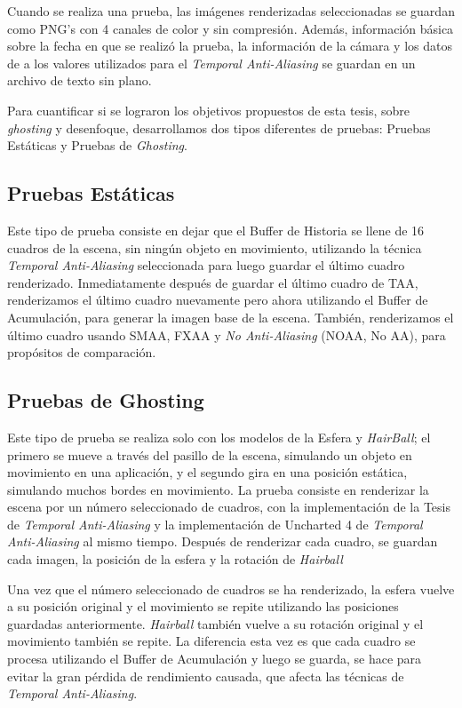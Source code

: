 \documentclass[pregrado]{tesis-usb} %
\begin{document}
Cuando se realiza una prueba, las imágenes renderizadas seleccionadas se guardan como PNG’s con 4 canales de color y sin compresión. Además, información básica sobre la fecha en que se realizó la prueba, la información de la cámara y los datos de a los valores utilizados para el \textit{Temporal Anti-Aliasing} se guardan en un archivo de texto sin plano.

Para cuantificar si se lograron los objetivos propuestos de esta tesis, sobre \textit{ghosting} y desenfoque, desarrollamos dos tipos diferentes de pruebas: Pruebas Estáticas y Pruebas de \textit{Ghosting}.

\subsection{Pruebas Estáticas}
Este tipo de prueba consiste en dejar que el Buffer de Historia se llene de 16 cuadros de la escena, sin ningún objeto en movimiento, utilizando la técnica \textit{Temporal Anti-Aliasing} seleccionada para luego guardar el último cuadro renderizado. Inmediatamente después de guardar el último cuadro de TAA, renderizamos el último cuadro nuevamente pero ahora utilizando el Buffer de Acumulación, para generar la imagen base de la escena. También, renderizamos el último cuadro usando SMAA, FXAA y \textit{No Anti-Aliasing} (NOAA, No AA), para propósitos de comparación.

\subsection{Pruebas de Ghosting}
Este tipo de prueba se realiza solo con los modelos de la Esfera y \textit{HairBall}; el primero se mueve a través del pasillo de la escena, simulando un objeto en movimiento en una aplicación, y el segundo gira en una posición estática, simulando muchos bordes en movimiento. La prueba consiste en renderizar la escena por un número seleccionado de cuadros, con la implementación de la Tesis de \textit{Temporal Anti-Aliasing} y la implementación de Uncharted 4 de \textit{Temporal Anti-Aliasing} al mismo tiempo. Después de renderizar cada cuadro, se guardan cada imagen, la posición de la esfera y la rotación de \textit{Hairball}

Una vez que el número seleccionado de cuadros se ha renderizado, la esfera vuelve a su posición original y el movimiento se repite utilizando las posiciones guardadas anteriormente. \textit{Hairball} también vuelve a su rotación original y el movimiento también se repite. La diferencia esta vez es que cada cuadro se procesa utilizando el Buffer de Acumulación y luego se guarda, se hace para evitar la gran pérdida de rendimiento causada, que afecta las técnicas de \textit{Temporal Anti-Aliasing}.
\end{document}

